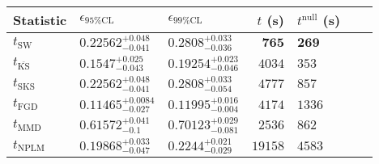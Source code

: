 \begin{tabular}{l|llr|llr}
Statistic & $\epsilon_{95\%\mathrm{CL}}$ & $\epsilon_{99\%\mathrm{CL}}$ & $t$ (s) & $t^{\mathrm{null}}$ (s) \\
	\midrule
	$t_{\mathrm{SW}}$ & $0.22562_{-0.041}^{+0.048}$ & $0.2808_{-0.036}^{+0.033}$ & ${\mathbf{765}}$ & ${\mathbf{269}}$ \\
	$t_{\overline{\mathrm{KS}}}$ & $0.1547_{-0.043}^{+0.025}$ & $0.19254_{-0.046}^{+0.023}$ & $4034$ & $353$ \\
	$t_{\mathrm{SKS}}$ & $0.22562_{-0.041}^{+0.048}$ & $0.2808_{-0.054}^{+0.033}$ & $4777$ & $857$ \\
	$t_{\mathrm{FGD}}$ & ${\mathbf{0.11465_{-0.027}^{+0.0084}}}$ & ${\mathbf{0.11995_{-0.004}^{+0.016}}}$ & $4174$ & $1336$ \\
	$t_{\mathrm{MMD}}$ & $0.61572_{-0.1}^{+0.041}$ & $0.70123_{-0.081}^{+0.029}$ & $2536$ & $862$ \\
\rowcolor{red!35}	$t_{\mathrm{NPLM}}$ & $0.19868_{-0.047}^{+0.033}$ & $0.2244_{-0.029}^{+0.021}$ & $19158$ & $4583$ \\
	\bottomrule
\end{tabular}